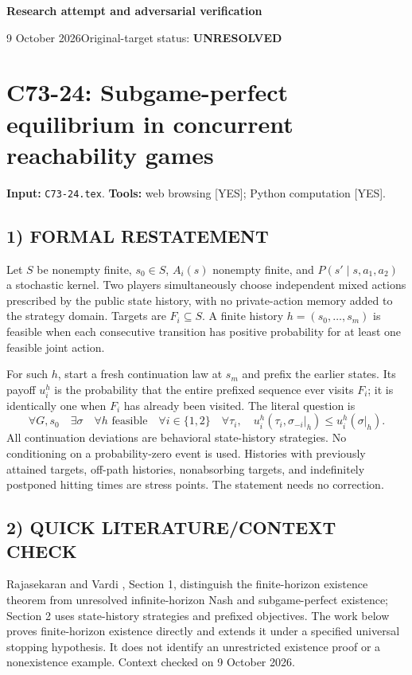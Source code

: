 \documentclass[11pt,a4paper]{article}
\theoremstyle{definition}
\theoremstyle{remark}
\begin{document}
{\large\bfseries Research attempt and adversarial verification}\par
9 October 2026\hfill Original-target status: \textbf{UNRESOLVED}\par
\section{C73-24: Subgame-perfect equilibrium in concurrent reachability games}
\label{sec:C73-24}
\noindent\textbf{Input:} \texttt{C73-24.tex}. \quad\textbf{Tools:} web browsing [YES]; Python computation [YES].
\subsection*{1) FORMAL RESTATEMENT}
Let $S$ be nonempty finite, $s_0\in S$, $A_i(s)$ nonempty finite, and $P(s'\mid s,a_1,a_2)$ a stochastic kernel. Two players simultaneously choose independent mixed actions prescribed by the public state history, with no private-action memory added to the strategy domain. Targets are $F_i\subseteq S$. A finite history $h=(s_0,\ldots,s_m)$ is feasible when each consecutive transition has positive probability for at least one feasible joint action.

For such $h$, start a fresh continuation law at $s_m$ and prefix the earlier states. Its payoff $u_i^h$ is the probability that the entire prefixed sequence ever visits $F_i$; it is identically one when $F_i$ has already been visited. The literal question is
\[
 \forall G,s_0\quad\exists\sigma\quad\forall h\text{ feasible}\quad
 \forall i\in\{1,2\}\quad\forall\tau_i,
 \quad u_i^h(\tau_i,\sigma_{-i}|_h)\leq u_i^h(\sigma|_h).
\]
All continuation deviations are behavioral state-history strategies. No conditioning on a probability-zero event is used. Histories with previously attained targets, off-path histories, nonabsorbing targets, and indefinitely postponed hitting times are stress points. The statement needs no correction.

\subsection*{2) QUICK LITERATURE/CONTEXT CHECK}
Rajasekaran and Vardi \cite{reach-source}, Section 1, distinguish the finite-horizon existence theorem from unresolved infinite-horizon Nash and subgame-perfect existence; Section 2 uses state-history strategies and prefixed objectives. The work below proves finite-horizon existence directly and extends it under a specified universal stopping hypothesis. It does not identify an unrestricted existence proof or a nonexistence example. Context checked on 9 October 2026.
\end{document}
